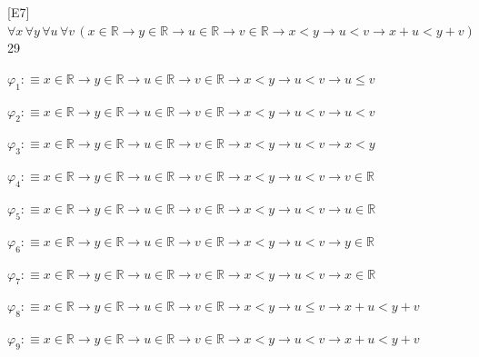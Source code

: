 \begin{fullproof}{[E7]}{$\forall x\,\forall y\,\forall u\,\forall v\,(x \in \mathbb{R} \to y \in \mathbb{R} \to u \in \mathbb{R} \to v \in \mathbb{R} \to x < y \to u < v \to x + u < y + v)$}{29}
\begin{abbrevlist}
\item $\varphi_{1} :\equiv x \in \mathbb{R} \to y \in \mathbb{R} \to u \in \mathbb{R} \to v \in \mathbb{R} \to x < y \to u < v \to u \leq v$
\item $\varphi_{2} :\equiv x \in \mathbb{R} \to y \in \mathbb{R} \to u \in \mathbb{R} \to v \in \mathbb{R} \to x < y \to u < v \to u < v$
\item $\varphi_{3} :\equiv x \in \mathbb{R} \to y \in \mathbb{R} \to u \in \mathbb{R} \to v \in \mathbb{R} \to x < y \to u < v \to x < y$
\item $\varphi_{4} :\equiv x \in \mathbb{R} \to y \in \mathbb{R} \to u \in \mathbb{R} \to v \in \mathbb{R} \to x < y \to u < v \to v \in \mathbb{R}$
\item $\varphi_{5} :\equiv x \in \mathbb{R} \to y \in \mathbb{R} \to u \in \mathbb{R} \to v \in \mathbb{R} \to x < y \to u < v \to u \in \mathbb{R}$
\item $\varphi_{6} :\equiv x \in \mathbb{R} \to y \in \mathbb{R} \to u \in \mathbb{R} \to v \in \mathbb{R} \to x < y \to u < v \to y \in \mathbb{R}$
\item $\varphi_{7} :\equiv x \in \mathbb{R} \to y \in \mathbb{R} \to u \in \mathbb{R} \to v \in \mathbb{R} \to x < y \to u < v \to x \in \mathbb{R}$
\item $\varphi_{8} :\equiv x \in \mathbb{R} \to y \in \mathbb{R} \to u \in \mathbb{R} \to v \in \mathbb{R} \to x < y \to u \leq v \to x + u < y + v$
\item $\varphi_{9} :\equiv x \in \mathbb{R} \to y \in \mathbb{R} \to u \in \mathbb{R} \to v \in \mathbb{R} \to x < y \to u < v \to x + u < y + v$
\end{abbrevlist}
\end{fullproof}
